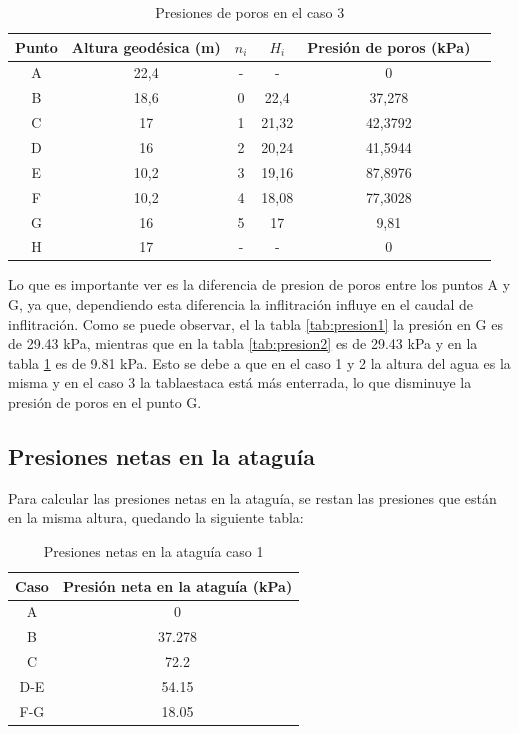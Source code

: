 \documentclass{article}
\begin{document}
\begin{table}[h!]
    \centering
      \begin{tabular}{cccccc}
      \hline
      \textbf{Punto} & \textbf{Altura geodésica (m)} & \textbf{$n_i$} & \textbf{$H_i$} & \textbf{Presión de poros (kPa)} \\ \hline
      A &  22,4 & - & - & 0 \\ 
      B &  18,6 & 0 & 22,4 & 37,278 \\ 
      C & 17 & 1 & 21,32 & 42,3792 \\ 
      D & 16 & 2 & 20,24 & 41,5944 \\ 
      E &  10,2 & 3 & 19,16 & 87,8976 \\ 
      F &  10,2 & 4 & 18,08 & 77,3028 \\ 
      G & 16 & 5 & 17 & 9,81 \\ 
      H & 17 & - & - & 0 \\ \hline
      \end{tabular}
    \caption{Presiones de poros en el caso 3}
    \label{tab:presion3}
\end{table}
    
Lo que es importante ver es la diferencia de presion de poros entre los puntos A y G, ya que, dependiendo esta diferencia la inflitración influye en el caudal de inflitración. Como se puede observar, el la tabla \ref{tab:presion1} la presión en G es de 29.43 kPa, mientras que en la tabla \ref{tab:presion2} es de 29.43 kPa y en la tabla \ref{tab:presion3} es de 9.81 kPa. Esto se debe a que en el caso 1 y 2 la altura del agua es la misma y en el caso 3 la tablaestaca está más enterrada, lo que disminuye la presión de poros en el punto G.

\newpage

\subsection{Presiones netas en la ataguía}
Para calcular las presiones netas en la ataguía, se restan las presiones que están en la misma altura, quedando la siguiente tabla:

\begin{table}[h!]
  \centering
  \begin{tabular}{cc}
    \hline
    \textbf{Caso} & \textbf{Presión neta en la ataguía (kPa)} \\
    \hline
    A & 0 \\
    B & 37.278 \\
    C & 72.2 \\
    D-E & 54.15\\
    F-G & 18.05 \\
    \hline  
  \end{tabular}
  \caption{Presiones netas en la ataguía caso 1}
  \label{tab:presion_neta1}
\end{table}
\end{document}

